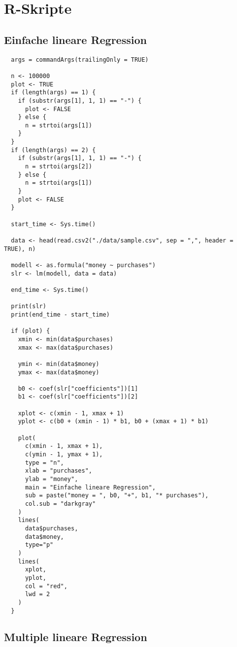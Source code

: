 \chapter{R-Skripte}

\section{Einfache lineare Regression}

\begin{verbatim}
  args = commandArgs(trailingOnly = TRUE)

  n <- 100000
  plot <- TRUE
  if (length(args) == 1) {
    if (substr(args[1], 1, 1) == "-") {
      plot <- FALSE
    } else {
      n = strtoi(args[1])
    }
  }
  if (length(args) == 2) {
    if (substr(args[1], 1, 1) == "-") {
      n = strtoi(args[2])
    } else {
      n = strtoi(args[1])
    }
    plot <- FALSE
  }

  start_time <- Sys.time()

  data <- head(read.csv2("./data/sample.csv", sep = ",", header = TRUE), n)

  modell <- as.formula("money ~ purchases")
  slr <- lm(modell, data = data)

  end_time <- Sys.time()

  print(slr)
  print(end_time - start_time)

  if (plot) {
    xmin <- min(data$purchases)
    xmax <- max(data$purchases)

    ymin <- min(data$money)
    ymax <- max(data$money)

    b0 <- coef(slr["coefficients"])[1]
    b1 <- coef(slr["coefficients"])[2]

    xplot <- c(xmin - 1, xmax + 1)
    yplot <- c(b0 + (xmin - 1) * b1, b0 + (xmax + 1) * b1)

    plot(
      c(xmin - 1, xmax + 1),
      c(ymin - 1, ymax + 1),
      type = "n",
      xlab = "purchases",
      ylab = "money",
      main = "Einfache lineare Regression",
      sub = paste("money = ", b0, "+", b1, "* purchases"),
      col.sub = "darkgray"
    )
    lines(
      data$purchases,
      data$money,
      type="p"
    )
    lines(
      xplot,
      yplot,
      col = "red",
      lwd = 2
    )
  }
\end{verbatim}

\section{Multiple lineare Regression}

